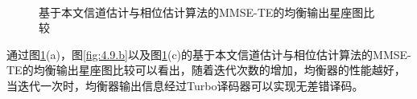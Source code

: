 \begin{figure}
    \centering
    \;
    \\
    \caption{基于本文信道估计与相位估计算法的MMSE-TE的均衡输出星座图比较}
    \label{fig:4.9}
\end{figure}

通过图\ref{fig:4.9}(a)，图\ref{fig:4.9.b}以及图\ref{fig:4.9}(c)的基于本文信道估计与相位估计算法的MMSE-TE的均衡输出星座图比较可以看出，随着迭代次数的增加，均衡器的性能越好，当迭代一次时，均衡器输出信息经过Turbo译码器可以实现无差错译码。
